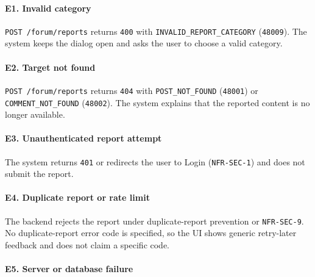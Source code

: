 \documentclass[12pt]{article}
\begin{document}
\paragraph*{E1. Invalid category}
\par\medskip

\texttt{POST /forum/reports} returns \texttt{400} with \texttt{INVALID\_REPORT\_CATEGORY} (\texttt{48009}). The system keeps the dialog open and asks the user to choose a valid category.
\par\medskip

\hypertarget{sec:e2-target-not-found}{}
\paragraph*{E2. Target not found}
\par\medskip

\texttt{POST /forum/reports} returns \texttt{404} with \texttt{POST\_NOT\_FOUND} (\texttt{48001}) or \texttt{COMMENT\_NOT\_FOUND} (\texttt{48002}). The system explains that the reported content is no longer available.
\par\medskip

\hypertarget{sec:e3-unauthenticated-report-attempt}{}
\paragraph*{E3. Unauthenticated report attempt}
\par\medskip

The system returns \texttt{401} or redirects the user to Login (\texttt{NFR-SEC-1}) and does not submit the report.
\par\medskip

\hypertarget{sec:e4-duplicate-report-or-rate-limit}{}
\paragraph*{E4. Duplicate report or rate limit}
\par\medskip

The backend rejects the report under duplicate-report prevention or \texttt{NFR-SEC-9}. No duplicate-report error code is specified, so the UI shows generic retry-later feedback and does not claim a specific code.
\par\medskip

\hypertarget{sec:e5-server-or-database-failure}{}
\paragraph*{E5. Server or database failure}
\par\medskip
\end{document}
